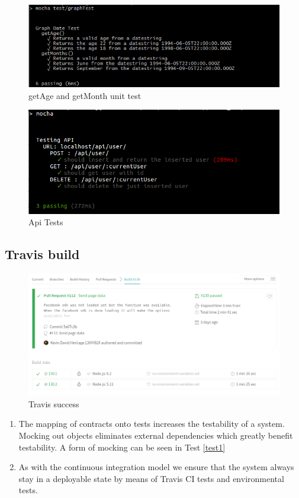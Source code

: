 \documentclass{article}
\begin{document}
	\begin{figure}[H]
	\includegraphics[width=15cm]{images/getAge.png}
	\caption{getAge and getMonth unit test}
	\end{figure}
	
	\begin{figure}[H]
	\includegraphics[width=15cm]{images/tests.png}
	\caption{Api Tests}
	\end{figure}
	
	
	\pagebreak
	
	\subsection{Travis build}
	\begin{figure}[H]
	\includegraphics[width=15cm]{images/Travis.png}
	\caption{Travis success }
	\end{figure}	
	
\begin{enumerate}
	\item The mapping of contracts onto tests increases the testability of a system. Mocking out objects eliminates external dependencies which greatly benefit testability. A form of mocking can be seen in Test \ref{test1}
	\item As with the continuous integration model we ensure that the system always stay in a deployable state by means of Travis CI tests and environmental tests.
\end{enumerate}
\end{document}
